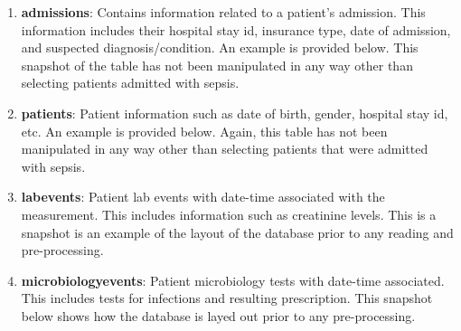 \documentclass[11pt]{article}
\begin{document}
	\begin{enumerate}
		\item \textbf{admissions}: Contains information related to a patient's admission. This information includes their hospital stay id, insurance type, date of admission, and suspected diagnosis/condition. An example is provided below. This snapshot of the table has not been manipulated in any way other than selecting patients admitted with sepsis.
		\begin{center}
		\end{center}
		\item \textbf{patients}: Patient information such as date of birth, gender, hospital stay id, etc. An example is provided below. Again, this table has not been manipulated in any way other than selecting patients that were admitted with sepsis.
		\begin{center}
		\end{center}
		\item \textbf{labevents}: Patient lab events with date-time associated with the measurement. This includes information such as creatinine levels. This is a snapshot is an example of the layout of the database prior to any reading and pre-processing.
		\begin{center}
		\end{center}
		\item \textbf{microbiologyevents}: Patient microbiology tests with date-time associated. This includes tests for infections and resulting prescription. This snapshot below shows how the database is layed out prior to any pre-processing. 
		\begin{center}
		\end{center}
	\end{enumerate}
	
\end{document}
